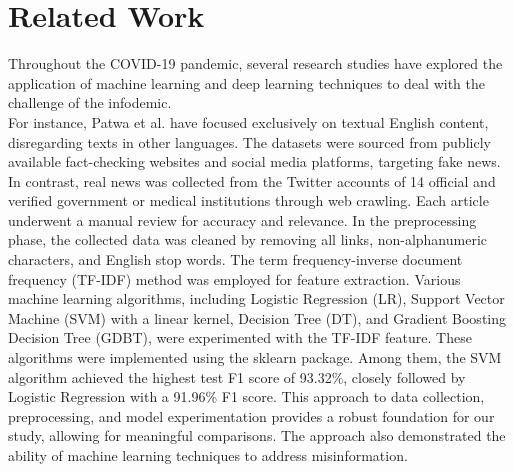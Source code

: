 \chapter{Related Work}
\label{ch:relatedwork}

Throughout the COVID-19 pandemic, several research studies have explored the application of machine learning and deep learning techniques to deal with the challenge of the infodemic.\\

For instance, Patwa et al.\cite{b4} have focused exclusively on textual English content, disregarding texts in other languages. The datasets were sourced from publicly available fact-checking websites and social media platforms, targeting fake news. In contrast, real news was collected from the Twitter accounts of 14 official and verified government or medical institutions through web crawling. Each article underwent a manual review for accuracy and relevance.
In the preprocessing phase, the collected data was cleaned by removing all links, non-alphanumeric characters, and English stop words. The term frequency-inverse document frequency (TF-IDF) method was employed for feature extraction. Various machine learning algorithms, including Logistic Regression (LR), Support Vector Machine (SVM) with a linear kernel, Decision Tree (DT), and Gradient Boosting Decision Tree (GDBT), were experimented with the TF-IDF feature. These algorithms were implemented using the sklearn package. Among them, the SVM algorithm achieved the highest test F1 score of 93.32\%, closely followed by Logistic Regression with a 91.96\% F1 score.
This approach to data collection, preprocessing, and model experimentation provides a robust foundation for our study, allowing for meaningful comparisons. The approach also demonstrated the ability of machine learning techniques to address misinformation.\\

